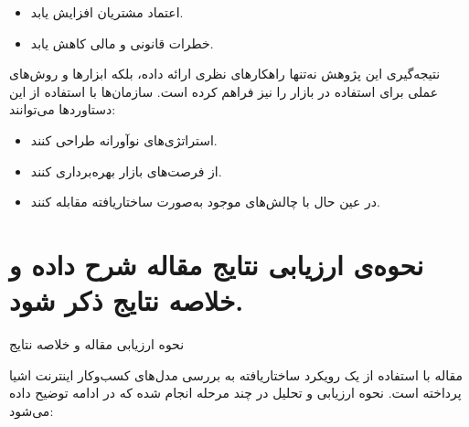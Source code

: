 \documentclass[10pt, twocolumn]{article}
\begin{document}
\begin{enumerate}
\begin{itemize}
\item 
اعتماد مشتریان افزایش یابد.  
\item 
خطرات قانونی و مالی کاهش یابد.  
\end{itemize}
\end{enumerate}

 نتیجه‌گیری  
این پژوهش نه‌تنها راهکارهای نظری ارائه داده، بلکه ابزارها و روش‌های عملی برای استفاده در بازار را نیز فراهم کرده است. سازمان‌ها با استفاده از این دستاوردها می‌توانند:

\begin{itemize}
\item استراتژی‌های نوآورانه طراحی کنند.  
\item از فرصت‌های بازار  بهره‌برداری کنند.  
\item در عین حال با چالش‌های موجود به‌صورت ساختاریافته مقابله کنند.
\end{itemize}  

\section{نحوه‌ی ارزیابی نتایج مقاله شرح داده و خلاصه نتایج ذکر شود.}
نحوه ارزیابی مقاله و خلاصه نتایج  

مقاله با استفاده از یک رویکرد ساختاریافته به بررسی مدل‌های کسب‌وکار اینترنت اشیا  پرداخته است. نحوه ارزیابی و تحلیل در چند مرحله انجام شده که در ادامه توضیح داده می‌شود:  
\end{document}
